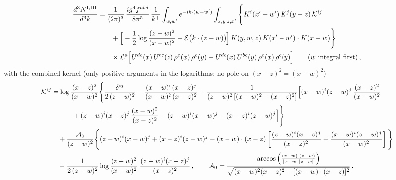 {\color{red}
\begin{align}
\frac{d^{3}N^{\rm I,III}}{d^{3}k}&=\frac{1}{(2\pi)^{3}}\,\frac{ig^{4}f^{abd}}{8\pi^{5}}\,\frac{1}{k^{+}}\int_{w,w'}e^{-ik\cdot(w-w')}\int_{x,y,z,x'}\Bigg\{K^{i}(x'-w')\,K^{j}(y-z)\,\mathcal{K}^{ij}\notag\\
&\qquad+\Big[-\frac12\log\frac{(z-w)^{2}}{(x-w)^{2}}-\mathcal{E}\big(k\cdot(z-w)\big)\Big]\,K(y,w,z)\,K(x'-w')\cdot K(x-w)\Bigg\}\notag\\&\qquad\times\mathcal{L}^{a}\Big[U^{de}(x)\,U^{bc}(z)\,\rho^{e}(x)\,\rho^{c}(y)-U^{de}(x)\,U^{bc}(y)\,\rho^{e}(x)\,\rho^{c}(y)\Big]\qquad(w\text{ integral first})\,,\label{eq:fx-GIIII}
\end{align}
with the combined kernel (only positive arguments in the logarithms; no pole on $(x-z)^{2}=(x-w)^{2}$)
\begin{align}
\mathcal{K}^{ij}&=\log\frac{(x-z)^{2}}{(x-w)^{2}}\Bigg\{\frac{\delta^{ij}}{2\,(z-w)^{2}}-\frac{(x-w)^{i}\,(x-z)^{j}}{(x-w)^{2}\,(x-z)^{2}}
+\frac{1}{(z-w)^{2}\left[(x-w)^{2}-(x-z)^{2}\right]}\Big[(x-w)^{i}(z-w)^{j}\,\frac{(x-z)^{2}}{(x-w)^{2}}\notag\\
&\qquad\quad+(z-w)^{i}(x-z)^{j}\,\frac{(x-w)^{2}}{(x-z)^{2}}-(z-w)^{i}(x-w)^{j}-(x-z)^{i}(z-w)^{j}\Big]\Bigg\}\notag\\
&\quad+\frac{\mathcal{A}_{0}}{(z-w)^{2}}\Bigg\{(z-w)^{i}(x-w)^{j}+(x-z)^{i}(z-w)^{j}-(x-w)\cdot(x-z)\left[\frac{(z-w)^{i}(x-z)^{j}}{(x-z)^{2}}+\frac{(x-w)^{i}(z-w)^{j}}{(x-w)^{2}}\right]\Bigg\}\notag\\
&\quad-\frac{1}{2\,(z-w)^{2}}\log\frac{(z-w)^{2}}{(x-w)^{2}}\;\frac{(z-w)^{i}(x-z)^{j}}{(x-z)^{2}}\,,\qquad
\mathcal{A}_{0}=\frac{\arccos\Big(\frac{(x-w)\cdot(z-w)}{|x-w|\,|z-w|}\Big)}{\sqrt{(x-w)^{2}(x-z)^{2}-[(x-w)\cdot(x-z)]^{2}}}\,.\label{eq:fx-Kij}
\end{align}
}

